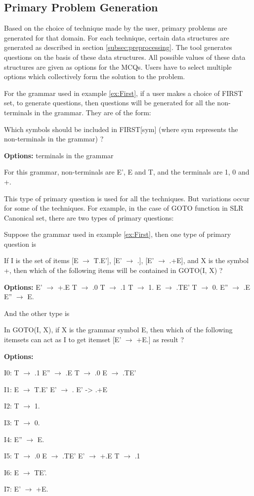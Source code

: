 \subsection{Primary Problem Generation}
\label{subsec:primary problem generation}
Based on the choice of technique made by the user, primary problems are generated for that domain. For each technique, certain data structures are generated as described in section \ref{subsec:preprocessing}. The tool generates questions on the basis of these data structures. All possible values of these data structures are given as options for the MCQs. Users have to select multiple options which collectively form the solution to the problem.

\begin{example}
\label{ex:Primary Prob Gen}
For the grammar used in example \ref{ex:First}, if a user makes a choice of FIRST set, to generate questions, then questions will be generated for all the non-terminals in the grammar. They are of the form:

Which symbols should be included in FIRST[sym] (where sym represents the non-terminals in the grammar) ?

\textbf{Options:} terminals in the grammar

For this grammar, non-terminals are E', E and T, and the terminals are 1, 0 and +.
\end{example}

This type of primary question is used for all the techniques. But variations occur for some of the techniques. For example, in the case of GOTO function in SLR Canonical set, there are two types of primary questions:
\begin{example}
\label{ex:goto primary problems}
Suppose the grammar used in example \ref{ex:First}, then one type of primary question is

If I is the set of items { [E $\to$ T.E'], [E' $\to$ .], [E' $\to$ .+E], } and X is the symbol +, then which of the following items will be contained in GOTO(I, X) ?

\textbf{Options:} E' $\to$ +.E \quad T $\to$ .0 \quad T $\to$ .1 \quad T $\to$ 1. \quad E $\to$ .TE' \quad T $\to$ 0. \quad E'' $\to$ .E \quad E'' $\to$ E.

And the other type is

In GOTO(I, X), if X is the grammar symbol E, then which of the following itemsets can act as I to get itemset {[E' $\to$ +E.]} as result ?

\textbf{Options:}

I0: T $\to$ .1 \quad E'' $\to$ .E \quad T $\to$ .0 \quad E $\to$ .TE'

I1: E $\to$ T.E' \quad E' $\to$ . \quad E' -> .+E

I2: T $\to$ 1.

I3: T $\to$ 0.

I4: E'' $\to$ E.

I5: T $\to$ .0 \quad E $\to$ .TE' \quad E' $\to$ +.E \quad T $\to$ .1

I6: E $\to$ TE'.    

I7: E' $\to$ +E.
\end{example}

